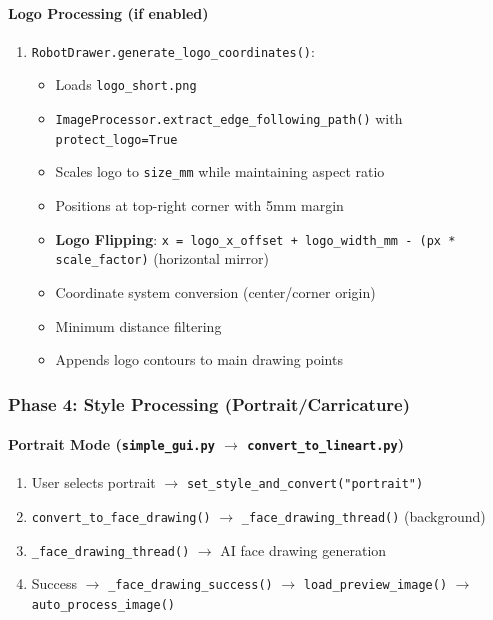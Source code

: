 \documentclass[a4paper,12pt]{article}
\begin{document}
\paragraph{Logo Processing (if enabled)}
\begin{enumerate}
\item \texttt{RobotDrawer.generate\_logo\_coordinates()}:
\begin{itemize}
\item Loads \texttt{logo\_short.png}
\item \texttt{ImageProcessor.extract\_edge\_following\_path()} with \texttt{protect\_logo=True}
\item Scales logo to \texttt{size\_mm} while maintaining aspect ratio
\item Positions at top-right corner with 5mm margin
\item \textbf{Logo Flipping}: \texttt{x = logo\_x\_offset + logo\_width\_mm - (px * scale\_factor)} (horizontal mirror)
\item Coordinate system conversion (center/corner origin)
\item Minimum distance filtering
\item Appends logo contours to main drawing points
\end{itemize}
\end{enumerate}

\subsubsection{Phase 4: Style Processing (Portrait/Carricature)}

\paragraph{Portrait Mode (\texttt{simple\_gui.py} $\rightarrow$ \texttt{convert\_to\_lineart.py})}
\begin{enumerate}
\item User selects portrait $\rightarrow$ \texttt{set\_style\_and\_convert("portrait")}
\item \texttt{convert\_to\_face\_drawing()} $\rightarrow$ \texttt{\_face\_drawing\_thread()} (background)
\item \texttt{\_face\_drawing\_thread()} $\rightarrow$ AI face drawing generation
\item Success $\rightarrow$ \texttt{\_face\_drawing\_success()} $\rightarrow$ \texttt{load\_preview\_image()} $\rightarrow$ \texttt{auto\_process\_image()}
\end{enumerate}
\end{document}
